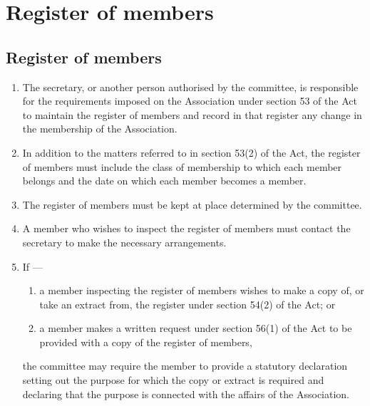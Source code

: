 \documentclass[../constitution.tex]{subfiles}
\begin{document}
\hypertarget{division-3-register-of-members}{%
\section{Register of members}\label{division-3-register-of-members}}

\hypertarget{register-of-members}{%
\subsection{Register of members}\label{register-of-members}}

\begin{enumerate}

\item The secretary, or another person authorised by the committee, is responsible for the requirements imposed on the Association under section 53 of the Act to maintain the register of members and record in that register any change in the membership of the Association.
\item In addition to the matters referred to in section 53(2) of the Act, the register of members must include the class of membership  to which each member belongs and the date on which each member becomes a member.
\item The register of members must be kept at  place determined by the committee. 
\item A member who wishes to inspect the register of members must contact the secretary to make the necessary arrangements.
\item If ---

  \begin{enumerate}
  \item a member inspecting the register of members wishes to make a copy of, or take an extract from, the register under section 54(2) of the Act; or
  \item a member makes a written request under section 56(1) of the Act to be provided with a copy of the register of members,

  \end{enumerate}
  the committee may require the member to provide a statutory declaration setting out the purpose for which the copy or extract is required and declaring that the purpose is connected with the affairs of the Association.
\end{enumerate}
\end{document}
